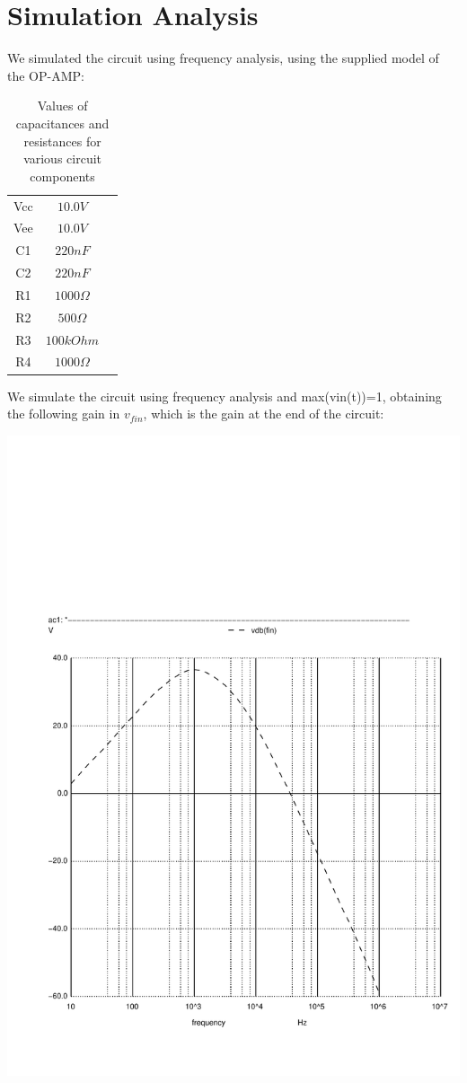 \section{Simulation Analysis}
\label{sec:simulation}

We simulated the circuit using frequency analysis, using the supplied model of the OP-AMP:

\begin{table}[H]
\addtolength{\tabcolsep}{-4pt}
\caption{Values of capacitances and resistances for various circuit components}
\vspace{-3mm}
\begin{tabular}{|c|c|c|}
\hline
Vcc & $10.0 V$\\
Vee & $10.0 V$\\
C1 & $220 nF$\\
C2 & $220 nF$\\
R1 & $1000 \Omega$\\
R2 & $500 \Omega$\\
R3 & $100 kOhm$\\
R4 & $1000 \Omega$\\
\hline
\end{tabular}
\label{tab:Components}
\end{table}

\par

We simulate the circuit using frequency analysis and max(vin(t))=1, obtaining the following gain in $v_{fin}$, which is the gain at the end of the circuit:

\includegraphics[width=0.8\linewidth]{../sim/vo1f.pdf}

